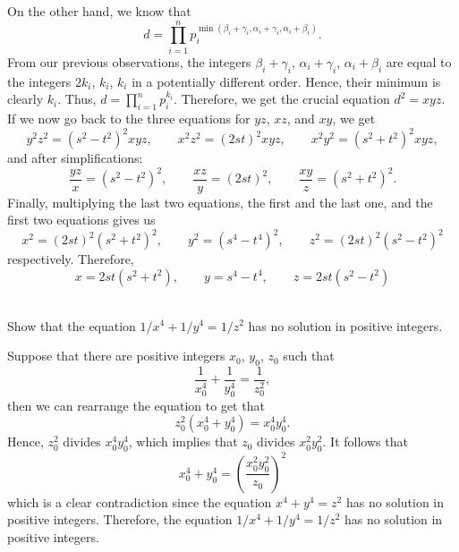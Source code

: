 \begin{solution}
    On the other hand, we know that 
    $$d = \prod_{i=1}^{n}p_i^{\min(\beta_i + \gamma_i, \alpha_i + \gamma_i, \alpha_i + \beta_i)}.$$
    From our previous observations, the integers $\beta_i + \gamma_i$, $\alpha_i + \gamma_i$, $\alpha_i + \beta_i$ are equal to the integers $2k_i$, $k_i$, $k_i$ in a potentially different order. Hence, their minimum is clearly $k_i$. Thus, $d = \prod_{i=1}^{n}p_i^{k_i}$. Therefore, we get the crucial equation $d^2 = xyz$.\\

    \noindent If we now go back to the three equations for $yz$, $xz$, and $xy$, we get
    $$y^2z^2 = (s^2 - t^2)^2xyz, \qquad x^2z^2 = (2st)^2xyz, \qquad x^2y^2 = (s^2 + t^2)^2xyz,$$
    and after simplifications:
    $$\frac{yz}{x} = (s^2 - t^2)^2, \qquad \frac{xz}{y} = (2st)^2, \qquad \frac{xy}{z} = (s^2 + t^2)^2.$$  
    Finally, multiplying the last two equations, the first and the last one, and the first two equations gives us
    $$x^2 = (2st)^2(s^2 + t^2)^2, \qquad y^2 = (s^4 - t^4)^2, \qquad z^2 = (2st)^2(s^2 - t^2)^2$$
    respectively. Therefore, 
    $$x = 2st(s^2 + t^2), \qquad y = s^4 - t^4, \qquad z = 2st(s^2 - t^2)$$ \\
\end{solution}

\begin{exercise}
    Show that the equation $1/x^4 + 1/y^4 = 1/z^2$ has no solution in positive integers. \\
\end{exercise}

\begin{solution}
    Suppose that there are positive integers $x_0$, $y_0$, $z_0$ such that
    $$\frac{1}{x_0^4} + \frac{1}{y_0^4} = \frac{1}{z_0^2},$$
    then we can rearrange the equation to get that
    $$z_0^2(x_0^4 + y_0^4) = x_0^4y_0^4.$$
    Hence, $z_0^2$ divides $x_0^4y_0^4$, which implies that $z_0$ divides $x_0^2y_0^2$. It follows that
    $$x_0^4 + y_0^4 = \left(\frac{x_0^2y_0^2}{z_0}\right)^2$$
    which is a clear contradiction since the equation $x^4 + y^4 = z^2$ has no solution in positive integers. Therefore, the equation $1/x^4 + 1/y^4 = 1/z^2$ has no solution in positive integers.
\end{solution}